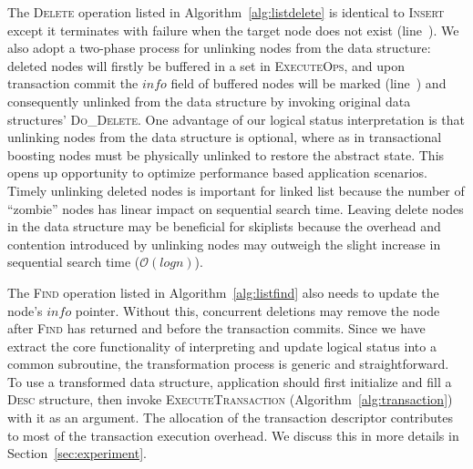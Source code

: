 \documentclass[]{sig-alternate-05-2015}
\begin{document}
The \textsc{Delete} operation listed in Algorithm~\ref{alg:listdelete} is identical to \textsc{Insert} except it terminates with failure when the target node does not exist (line~).
We also adopt a two-phase process for unlinking nodes from the data structure: deleted nodes will firstly be buffered in a set in \textsc{ExecuteOps}, and upon transaction commit the $info$ field of buffered nodes will be marked (line~) and consequently unlinked from the data structure by invoking original data structures' \textsc{Do\_Delete}.
One advantage of our logical status interpretation is that unlinking nodes from the data structure is optional, where as in transactional boosting nodes must be physically unlinked to restore the abstract state. 
This opens up opportunity to optimize performance based application scenarios.
Timely unlinking deleted nodes is important for linked list because the number of ``zombie'' nodes has linear impact on sequential search time.
Leaving delete nodes in the data structure may be beneficial for skiplists because the overhead and contention introduced by unlinking nodes may outweigh the slight increase in sequential search time ($\mathcal{O}(log{}n)$).

The \textsc{Find} operation listed in Algorithm~\ref{alg:listfind} also needs to update the node's $info$ pointer.
Without this, concurrent deletions may remove the node after \textsc{Find} has returned and before the transaction commits.
Since we have extract the core functionality of interpreting and update logical status into a common subroutine, the transformation process is generic and straightforward.
To use a transformed data structure, application should first initialize and fill a \textsc{Desc} structure, then invoke \textsc{ExecuteTransaction} (Algorithm~\ref{alg:transaction}) with it as an argument.
The allocation of the transaction descriptor contributes to most of the transaction execution overhead.
We discuss this in more details in Section~\ref{sec:experiment}.

\end{document}
